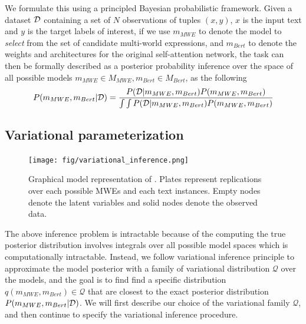 We formulate this using a principled Bayesian probabilistic framework. 
Given a dataset $\mathcal{D}$ containing a set of $N$ observations of tuples $(x,y)$,  $x$ is the input text and $y$ is the target labels of interest,
if we use  $m_{MWE}$ to denote the model to \textit{select} from the set of candidate multi-world expressions, and 
$m_{Bert}$ to denote the weights and architectures for the original self-attention network, the task can then be formally described as a posterior probability inference over the space of all possible models $m_{MWE} \in M_{MWE}, m_{Bert} \in M_{Bert}$, as the following
\begin{align*}
\small
\begin{split}
    P(m_{MWE}, m_{Bert} | \mathcalD) = \frac{  P( \mathcalD | m_{MWE}, m_{Bert} ) P(m_{MWE}, m_{Bert})  }{ \int \int P( \mathcalD | m_{MWE}, m_{Bert} ) P(m_{MWE}, m_{Bert}) }\\
\end{split}
\end{align*}


\subsection{Variational parameterization}\label{sec:var-param}


\begin{figure}[tb]
    \centering
    \texttt{[image: fig/variational\_inference.png]}
    \vspace{20pt}
    \caption{Graphical model representation of \BertMWE. Plates represent replications over each possible MWEs and each text  instances. Empty nodes denote the latent variables and solid nodes denote the observed data. }
    \label{fig:variational}
\end{figure}


The above inference problem is intractable because of the computing the true posterior distribution involves integrals over all possible model spaces which is computationally intractable. 
Instead, we follow  variational inference principle \cite{ranganath2014black} to approximate the model posterior with a family of variational distribution $\mathcal{Q}$ over the models, and the goal is to find find a specific distribution $q(m_{MWE}, m_{Bert}) \in \mathcal{Q}$ that are closest to the exact posterior distribution $P(m_{MWE}, m_{Bert} | \mathcal{D})$.
We will first describe our choice of the variational family $\mathcal{Q}$, and then continue to specify the variational inference procedure.


